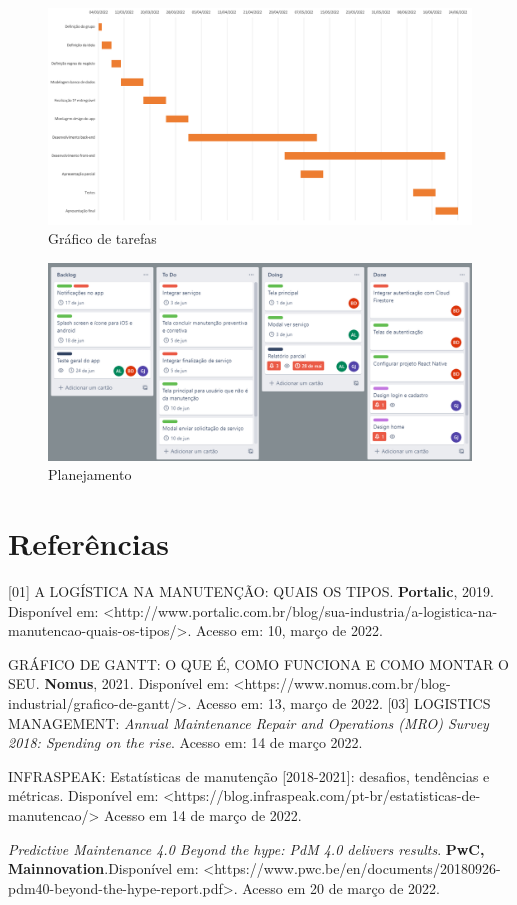 \documentclass[%
  a4paper,%
  12pt,%
  english,%
  brazilian,%
]{article}
\begin{document}
\begin{figure}[!htb]
\includegraphics[width = 0.95\linewidth]{Figures/grafico.png}
\caption{Gráfico de tarefas}
\end{figure}
\begin{figure}[!htb]
\includegraphics[width = 0.95\linewidth]{Figures/imagem.PNG}
\caption{Planejamento}
\end{figure}

\section{Referências}%
[01] A LOGÍSTICA NA MANUTENÇÃO: QUAIS OS TIPOS. \textbf{Portalic}, 2019. Disponível em: <http://www.portalic.com.br/blog/sua-industria/a-logistica-na-manutencao-quais-os-tipos/>. Acesso em: 10, março de 2022.\par
[02] GRÁFICO DE GANTT: O QUE É, COMO FUNCIONA E COMO MONTAR O SEU. \textbf{Nomus}, 2021. Disponível em: <https://www.nomus.com.br/blog-industrial/grafico-de-gantt/>. Acesso em: 13, março de 2022.
[03] LOGISTICS MANAGEMENT: \textit{Annual Maintenance Repair and Operations (MRO) Survey 2018: Spending on the rise}. Acesso em: 14 de março 2022.\par
[04] INFRASPEAK: Estatísticas de manutenção [2018-2021]: desafios, tendências e métricas. Disponível em: <https://blog.infraspeak.com/pt-br/estatisticas-de-manutencao/> Acesso em 14 de março de 2022.\par
[05]\textit{Predictive Maintenance 4.0 Beyond the hype: PdM 4.0 delivers results}. \textbf{PwC, Mainnovation}.Disponível em: <https://www.pwc.be/en/documents/20180926-pdm40-beyond-the-hype-report.pdf>. Acesso em 20 de março de 2022.

\end{document}
